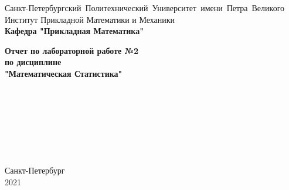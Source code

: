 \documentclass[a4paper]{article}
\author{Тырыкин Я. А. }
\date{March 2021}
\begin{document}
\begin{titlepage}
    \begin{center}
        \mbox{\normalsize{Санкт-Петербургский Политехнический Университет имени Петра Великого}}\\
        \normalsize{Институт Прикладной Математики и Механики}\\
        \large{\textbf{Кафедра "Прикладная Математика"}}
        
        \vfill
        
        \textbf{\Large{Отчет по лабораторной работе №2}}\\
        \textbf{\large{по дисциплине}}\\
        \textbf{\large"Математическая Статистика"}
        
        \vfill
        \\
        \\
        \\
        \\
        \\
        \\
        
    
        
        \vfill
    
    \end{center}
    
    \begin{center} 
        Санкт-Петербург \\
        2021 
    \end{center}
\end{titlepage}
\newpage
\end{document}
